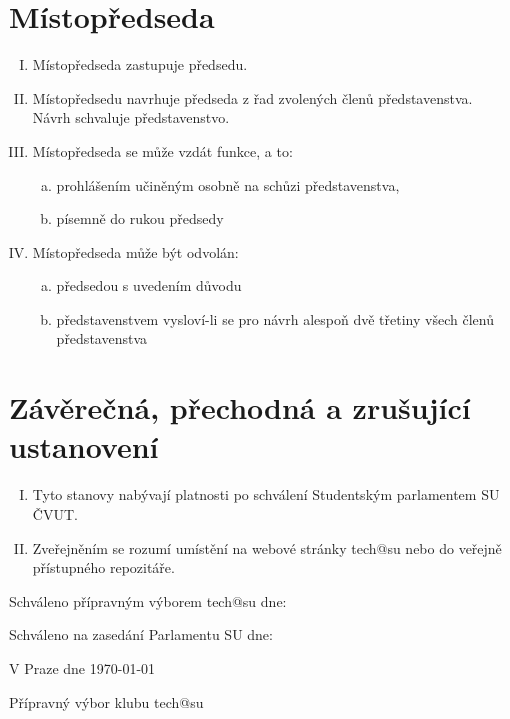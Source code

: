 \documentclass[10pt]{article}
\begin{document}
\section{Místopředseda}
	\begin{enumerate}[I.]
	\item Místopředseda zastupuje předsedu.  
	\item Místopředsedu navrhuje předseda z řad zvolených členů představenstva. Návrh schvaluje představenstvo.  
	\item Místopředseda se může vzdát funkce, a to:  
		\begin{enumerate}[a.]
		\item prohlášením učiněným osobně na schůzi představenstva,  
		\item písemně do rukou předsedy  
		\end{enumerate}
	\item Místopředseda může být odvolán:  
		\begin{enumerate}[a.]
		\item předsedou s uvedením důvodu
		\item představenstvem vysloví-li se pro návrh alespoň dvě třetiny všech členů představenstva
		\end{enumerate}
	\end{enumerate}

\section{Závěrečná, přechodná a zrušující ustanovení}
	\begin{enumerate}[I.]
	\item Tyto stanovy nabývají platnosti po schválení Studentským parlamentem SU ČVUT.
	\item Zveřejněním se rozumí umístění na webové stránky tech@su nebo do veřejně přístupného repozitáře.
	\end{enumerate}


\vspace{10mm}

Schváleno přípravným výborem tech@su dne:

Schváleno na zasedání Parlamentu SU dne:

\vspace{30mm}

\hfill V Praze dne \today

\hfill Přípravný výbor klubu tech@su
\end{document}
